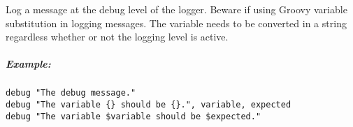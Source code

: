 \label{par:debug}

Log a message at the debug level of the logger. Beware if using Groovy
variable substitution in logging messages. The variable needs to be
converted in a string regardless whether or not the logging level is active.

\subparagraph{Example:}

\begin{lstlisting}[style=Groovybash, label={lst:example_debug}]
debug "The debug message."
debug "The variable {} should be {}.", variable, expected
debug "The variable $variable should be $expected."
\end{lstlisting}

